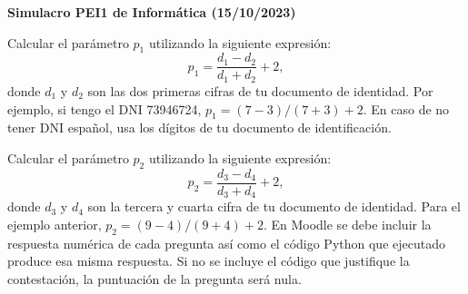 \documentclass[11pt,a4paper]{article}
\begin{document}
	

\begin{center} 
	{\bf \Large Simulacro PEI1 de Informática (15/10/2023)  }
\end{center} 	
	
Calcular el parámetro $p_1$ utilizando la siguiente expresión:
\begin{equation*}
p_1 = \frac{d_1 - d_2}{d_1 + d_2} + 2,
\end{equation*}
\noindent donde $d_1$ y $d_2$ son las dos primeras cifras de tu documento de identidad. Por ejemplo, si tengo el DNI 73946724, $p_1 = (7 - 3)/(7 + 3) + 2$. En caso de no tener DNI español, usa los dígitos de tu documento de identificación.

Calcular el parámetro $p_2$ utilizando la siguiente expresión:
\begin{equation*}
p_2 = \frac{d_3 - d_4}{d_3 + d_4} + 2,
\end{equation*}
donde $d_3$ y $d_4$ son la tercera y cuarta cifra de tu documento de identidad. Para el ejemplo anterior, $p_2 = (9 - 4)/(9 + 4) + 2$.
En Moodle se debe incluir la respuesta numérica de cada pregunta así como el código
Python que ejecutado produce esa misma respuesta. Si no se incluye el código que justifique la contestación, la puntuación de la pregunta será nula.
\end{document}
